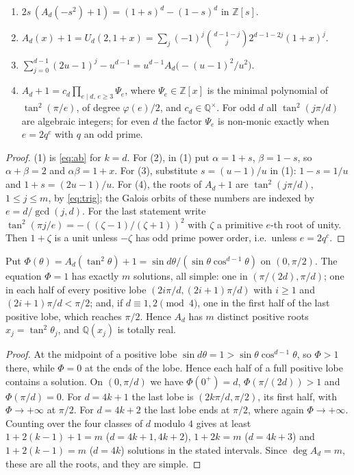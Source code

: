 \documentclass[11pt]{amsart}
\theoremstyle{definition}\newtheorem{definition}[theorem]{Definition}\newtheorem{example}[theorem]{Example}
\theoremstyle{remark}\newtheorem{remark}[theorem]{Remark}
\newcommand{\Q}{\mathbb Q}\newcommand{\Z}{\mathbb Z}\newcommand{\F}{\mathbb F}
\begin{document}
\begin{proposition}\label{prop:identities}
\begin{enumerate}
\item $2s\,(A_d(-s^2)+1)=(1+s)^d-(1-s)^d$ in $\Z[s]$.
\item $A_d(x)+1=U_d(2,1+x)=\sum_{j}(-1)^j\binom{d-1-j}{j}2^{d-1-2j}(1+x)^j$.
\item $\sum_{j=0}^{d-1}(2u-1)^j-u^{d-1}=u^{d-1}A_d\bigl(-(u-1)^2/u^2\bigr)$.
\item $A_d+1=c_d\prod_{e\mid d,\,e\ge3}\Psi_e$, where $\Psi_e\in\Z[x]$ is the minimal polynomial of $\tan^2(\pi/e)$, of degree $\varphi(e)/2$, and
$c_d\in\Q^\times$. For odd $d$ all $\tan^2(j\pi/d)$ are algebraic integers; for even $d$ the factor $\Psi_e$ is non-monic exactly when
$e=2q^c$ with $q$ an odd prime.
\end{enumerate}
\end{proposition}
\begin{proof}
(1) is \eqref{eq:ab} for $k=d$. For (2), in (1) put $\alpha=1+s$, $\beta=1-s$, so $\alpha+\beta=2$ and $\alpha\beta=1+x$. For (3), substitute
$s=(u-1)/u$ in (1): $1-s=1/u$ and $1+s=(2u-1)/u$. For (4), the roots of $A_d+1$ are $\tan^2(j\pi/d)$, $1\le j\le m$, by \eqref{eq:trig}; the
Galois orbits of these numbers are indexed by $e=d/\gcd(j,d)$. For the last statement write $\tan^2(\pi j/e)=-((\zeta-1)/(\zeta+1))^2$ with $\zeta$ a
primitive $e$-th root of unity. Then $1+\zeta$ is a unit unless $-\zeta$ has odd prime power order, i.e.\ unless $e=2q^c$.
\end{proof}

\begin{lemma}\label{lem:real}
Put $\Phi(\theta)=A_d(\tan^2\theta)+1=\sin d\theta/(\sin\theta\cos^{d-1}\theta)$ on $(0,\pi/2)$. The equation $\Phi=1$ has exactly $m$ solutions, all simple:
one in $(\pi/(2d),\pi/d)$; one in each half of every positive lobe $(2i\pi/d,(2i+1)\pi/d)$ with $i\ge1$ and $(2i+1)\pi/d<\pi/2$; and, if $d\equiv1,2\pmod4$, one
in the first half of the last positive lobe, which reaches $\pi/2$. Hence $A_d$ has $m$ distinct positive roots $x_j=\tan^2\theta_j$, and $\Q(x_j)$
is totally real.
\end{lemma}
\begin{proof}
At the midpoint of a positive lobe $\sin d\theta=1>\sin\theta\cos^{d-1}\theta$, so $\Phi>1$ there, while $\Phi=0$ at the ends of the lobe. Hence each
half of a full positive lobe contains a solution. On $(0,\pi/d)$ we have $\Phi(0^+)=d$, $\Phi(\pi/(2d))>1$ and $\Phi(\pi/d)=0$. For $d=4k+1$ the last
lobe is $(2k\pi/d,\pi/2)$, its first half, with $\Phi\to+\infty$ at $\pi/2$. For $d=4k+2$ the last lobe ends at $\pi/2$, where again
$\Phi\to+\infty$. Counting over the four classes of $d$ modulo $4$ gives at least $1+2(k-1)+1=m$ ($d=4k+1,4k+2$), $1+2k=m$ ($d=4k+3$) and
$1+2(k-1)=m$ ($d=4k$) solutions in the stated intervals. Since $\deg A_d=m$, these are all the roots, and they are simple.
\end{proof}
\end{document}
